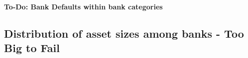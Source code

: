 \documentclass[12pt, a4paper]{article} %
\begin{document}
\textbf{To-Do: Bank Defaults within bank categories}

\fi

\newpage

\subsection{Distribution of asset sizes among banks - Too Big to Fail}
\label{sec:ToBigToFail}
\end{document}
